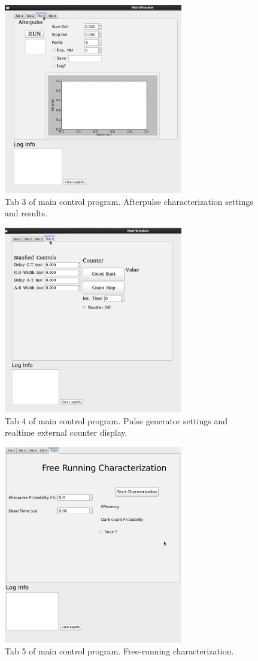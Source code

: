 \documentclass{article}
\begin{document}
\begin{figure}
\centering
\includegraphics[width=7.8cm]{images/tab3.png}
\caption{Tab 3 of main control program. Afterpulse characterization settings and results.}
\label{tab3}
\end{figure}

\begin{figure}
\centering
\includegraphics[width=7.8cm]{images/tab4.png}
\caption{Tab 4 of main control program. Pulse generator settings and realtime external counter display.}
\label{tab4}
\end{figure}

\begin{figure}
\centering
\includegraphics[width=7.8cm]{images/tab5.png}
\caption{Tab 5 of main control program. Free-running characterization.}
\label{tab5}
\end{figure}
\end{document}
